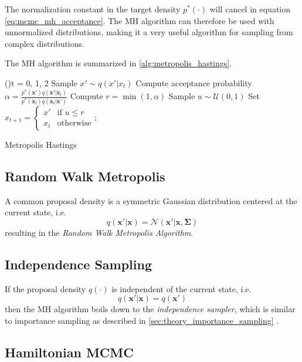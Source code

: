 The normalization constant in the target density $p^*(\cdot)$ will cancel in equation \eqref{eq:mcmc_mh_acceptance}. The MH algorithm can therefore be used with unnormalized distributions, making it a very useful algorithm for sampling from complex distributions. 

The MH algorithm is summarized in \cref{alg:metropolis_hastings}.
\begin{algorithm}
\SetAlgoLined
\For(){t = 0, 1, 2}{
    Sample $x' \sim q(x' | x_t)$ \;
    Compute acceptance probability \\
    $\alpha = \frac{p^*(\mathbf{x'}) q(\mathbf{x'} | \mathbf{x}_t)}{p^*(\mathbf{x}_t) q(\mathbf{x}_t | \mathbf{x'})}$\;
    Compute $r = \min(1, \alpha)$\;
    Sample $u \sim \mathcal{U}(0, 1)$\;
    Set $x_{t+1} = \begin{cases}x' & \text{if } u \leq r\\x_t & \text{otherwise}\end{cases}$;
}
\caption{Metropolis Hastings}
\label{alg:metropolis_hastings}
\end{algorithm}

\subsection{Random Walk Metropolis}\label{sec:random_walk_metropolis}
A common proposal density is a symmetric Gaussian distribution centered at the current state, i.e. $$q(\mathbf{x'} | \mathbf{x}) = \mathcal{N}(\mathbf{x'} | \mathbf{x}, \boldsymbol{\Sigma})$$ resulting in the \textit{Random Walk Metropolis Algorithm}.

\subsection{Independence Sampling}
If the proposal density $q(\cdot)$ is independent of the current state, i.e. $$q(\mathbf{x'} | \mathbf{x}) = q(\mathbf{x'})$$ then the MH algorithm boils down to the \textit{independence sampler}, which is similar to importance sampling as described in \cref{sec:theory_importance_sampling} \cite{murphy}.

\subsection{Hamiltonian MCMC}

